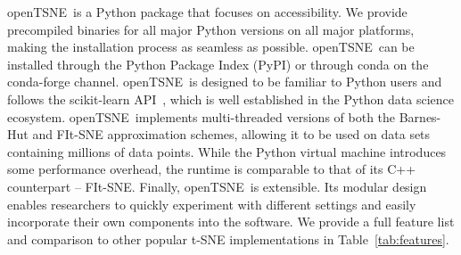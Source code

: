 \documentclass[twocolumn]{bmcart}
\newcommand{\opentsne}{\textsf{openTSNE}}
\begin{document}
\opentsne\ is a Python package that focuses on accessibility. We provide
precompiled binaries for all major Python versions on all major platforms,
making the installation process as seamless as possible. \opentsne\ can be
installed through the Python Package Index (PyPI) or through conda on the
conda-forge channel. \opentsne\ is designed to be familiar to Python users and
follows the \textsf{scikit-learn} API~\cite{sklearn_api}, which is well
established in the Python data science ecosystem. \opentsne\ implements
multi-threaded versions of both the Barnes-Hut and FIt-SNE approximation
schemes, allowing it to be used on data sets containing millions of data
points. While the Python virtual machine introduces some performance overhead,
the runtime is comparable to that of its C++ counterpart --
\textsf{FIt-SNE}. Finally, \opentsne\ is extensible. Its modular design enables
researchers to quickly experiment with different settings and easily
incorporate their own components into the software. We provide a full feature
list and comparison to other popular t-SNE implementations in
Table~\ref{tab:features}.
\end{document}
